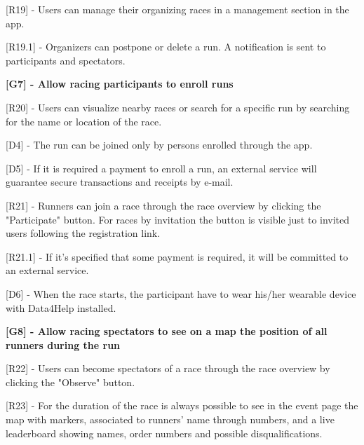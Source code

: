 [R19] - Users can manage their organizing races in a management section in the app. \newline

\hspace{\parindent}[R19.1] - Organizers can postpone or delete a run. A notification is sent to participants and spectators. \newline

\hspace{-\parindent}\textbf{[G7] - Allow racing participants to enroll runs} \newline

[R20] - Users can visualize nearby races or search for a specific run by searching for the name or location of the race. \newline

[D4] - The run can be joined only by persons enrolled through the app. \newline

[D5] - If it is required a payment to enroll a run, an external service will guarantee secure transactions and receipts by e-mail. \newline

[R21] - Runners can join a race through the race overview by clicking the "Participate" button. For races by invitation the button is visible just to invited users following the registration link. \newline

\hspace{\parindent}[R21.1] - If it's specified that some payment is required, it will be committed to an external service. \newline

[D6] - When the race starts, the participant have to wear his/her wearable device with Data4Help installed. \newline

\hspace{-\parindent}\textbf{[G8] - Allow racing spectators to see on a map the position of all runners during the run} \newline

[R22] - Users can become spectators of a race through the race overview by clicking the "Observe" button. \newline

[R23] - For the duration of the race is always possible to see in the event page the map with markers, associated to runners' name through numbers, and a live leaderboard showing names, order numbers and possible disqualifications. \newline

